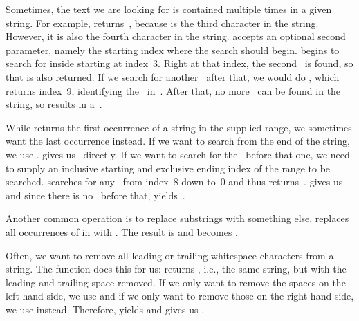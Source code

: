 Sometimes, the text we are looking for is contained multiple times in a given string.
For example,  returns~, because  is the third character in the string.
However, it is also the fourth character in the string.
 accepts an optional second parameter, namely the starting index where the search should begin.
 begins to search for  inside  starting at index~3.
Right at that index, the second~ is found, so that  is also returned.
If we search for another~ after that, we would do , which returns index~9, identifying the~ in~.
After that, no more~ can be found in the string, so  results in a~.%
%
\begin{sloppypar}%
While  returns the first occurrence of a string in the supplied range, we sometimes want the last occurrence instead.
If we want to search from the end of the string, we use .
 gives us~ directly.
If we want to search for the~ before that one, we need to supply an inclusive starting and exclusive ending index of the range to be searched.
 searches for any~ from index~8 down to~0 and thus returns~.
 gives us~ and since there is no~ before that,  yields~.
\end{sloppypar}%
%
\begin{sloppypar}%
Another common operation is to replace substrings with something else.
 replaces all occurrences of  in  with .
The result is  and  becomes .
\end{sloppypar}%
%
\begin{sloppypar}%
Often, we want to remove all leading or trailing whitespace characters from a string.
The  function does this for us:
 returns , i.e., the same string, but with the leading and trailing space removed.
If we only want to remove the spaces on the left-hand side, we use  and if we only want to remove those on the right-hand side, we use  instead.
Therefore,  yields  and  gives us .
\end{sloppypar}%
